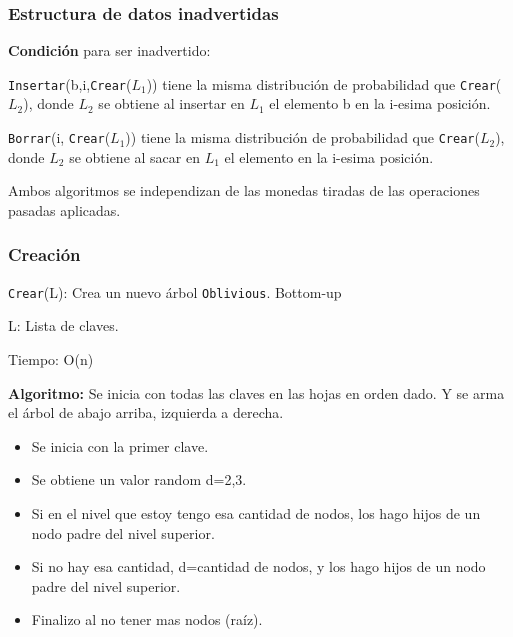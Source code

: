 \documentclass[10pt]{beamer}
\begin{document}
\begin{frame}
\frametitle{Estructura de datos inadvertidas}

\textbf{Condición} para ser inadvertido:
\pause

\texttt{Insertar}(b,i,\texttt{Crear}($L_1$)) tiene la misma distribución de probabilidad que \texttt{Crear}($L_2$), donde $L_{2}$
se obtiene al insertar en $L_{1}$ el elemento b en la i-esima posición.
\pause

\texttt{Borrar}(i, \texttt{Crear}($L_{1}$)) tiene la misma distribución de probabilidad que \texttt{Crear}($L_2$), donde $L_{2}$
se obtiene al sacar en $L_{1}$ el elemento en la i-esima posición.

\pause
Ambos algoritmos se independizan de las monedas tiradas de las operaciones pasadas aplicadas.
\end{frame}

\begin{frame}
\frametitle{Creación}

\texttt{Crear}(L): Crea un nuevo árbol \texttt{Oblivious}. Bottom-up

  L: Lista de claves.

  Tiempo: O(n)

\pause
\textbf{Algoritmo:}
  Se inicia con todas las claves en las hojas en orden dado.
  Y se arma el árbol de abajo arriba, izquierda a derecha.

\pause
\begin{itemize}\itemsep-1em
  \item Se inicia con la primer clave.
  \item Se obtiene un valor random d={2,3}.
\pause
  \item Si en el nivel que estoy tengo esa cantidad de nodos, los hago hijos de
    un nodo padre del nivel superior.
  \item Si no hay esa cantidad, d=cantidad de nodos, y los hago hijos de un nodo
    padre del nivel superior.
\pause
  \item Finalizo al no tener mas nodos (raíz).
\end{itemize}

\end{frame}

\end{document}
